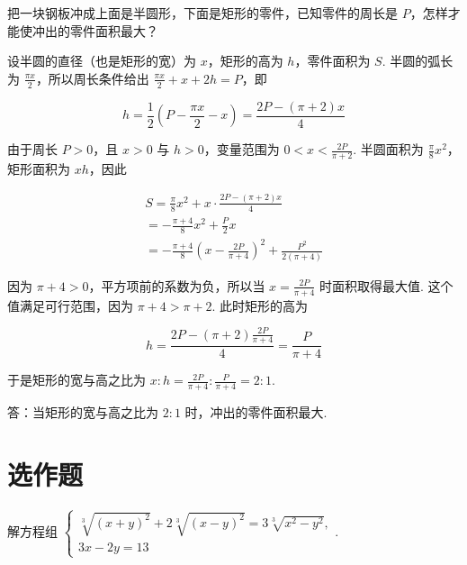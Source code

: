 \begin{problem}
把一块钢板冲成上面是半圆形，下面是矩形的零件，已知零件的周长是 \(P\)，怎样才能使冲出的零件面积最大？

\end{problem}

\begin{solution}
设半圆的直径（也是矩形的宽）为 \(x\)，矩形的高为 \(h\)，零件面积为 \(S\). 半圆的弧长为 \(\frac{\pi x}{2}\)，所以周长条件给出 \(\frac{\pi x}{2}+x+2h=P\)，即

\[
h=\frac{1}{2}\left(P-\frac{\pi x}{2}-x\right)=\frac{2P-\left(\pi+2\right)x}{4}
\]

由于周长 \(P>0\)，且 \(x>0\) 与 \(h>0\)，变量范围为 \(0<x<\frac{2P}{\pi+2}\). 半圆面积为 \(\frac{\pi}{8}x^2\)，矩形面积为 \(xh\)，因此

\[
\begin{gathered}
S=\frac{\pi}{8}x^2+x\cdot\frac{2P-\left(\pi+2\right)x}{4}\\
=-\frac{\pi+4}{8}x^2+\frac{P}{2}x\\
=-\frac{\pi+4}{8}\left(x-\frac{2P}{\pi+4}\right)^2+\frac{P^2}{2\left(\pi+4\right)}
\end{gathered}
\]

因为 \(\pi+4>0\)，平方项前的系数为负，所以当 \(x=\frac{2P}{\pi+4}\) 时面积取得最大值. 这个值满足可行范围，因为 \(\pi+4>\pi+2\). 此时矩形的高为

\[
h=\frac{2P-\left(\pi+2\right)\frac{2P}{\pi+4}}{4}=\frac{P}{\pi+4}
\]

于是矩形的宽与高之比为 \(x:h=\frac{2P}{\pi+4}:\frac{P}{\pi+4}=2:1\).

答：当矩形的宽与高之比为 \(2:1\) 时，冲出的零件面积最大.
\end{solution}

\section{选作题}

\begin{problem}
解方程组 \(\begin{cases}
\sqrt[3]{\left(x+y\right)^2}+2\sqrt[3]{\left(x-y\right)^2}=3\sqrt[3]{x^2-y^2},\\
3x-2y=13
\end{cases}\).
\end{problem}

